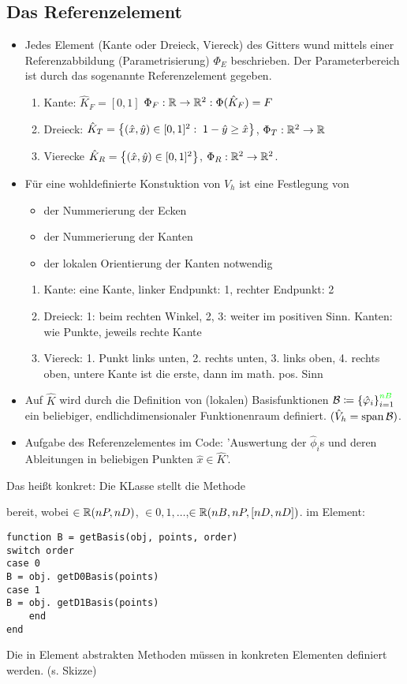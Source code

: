 \subsection{Das Referenzelement}
\begin{itemize}
\item Jedes Element (Kante oder Dreieck, Viereck) des Gitters wund mittels einer Referenzabbildung (Parametrisierung) $\Phi_E$ beschrieben. Der Parameterbereich ist durch das sogenannte Referenzelement gegeben. 
  \begin{enumerate}
  \item Kante: $\hat K_F = [0, 1]$ $\Phi_F: \mathbb{R} \to \mathbb{R}^2: \Phi(\hat K_F) = F$
\item Dreieck: $\hat K_T = \left\{ (\hat x,\hat y) \in [0, 1]^2: \; 1- \hat y \geq  \hat x \right\}$, $\Phi_T: \mathbb{R}^2 \to \mathbb{R}$
\item Vierecke $\hat K_R = \left\{ (\hat x, \hat y) \in [0,1]^2 \right\}$, $\Phi_R: \mathbb{R}^2 \to \mathbb{R}^2$. 
  \end{enumerate}
\item Für eine wohldefinierte Konstuktion von $V_h$ ist eine Festlegung von
  \begin{itemize}
  \item der Nummerierung der Ecken
  \item der Nummerierung der Kanten
  \item der lokalen Orientierung der Kanten notwendig
  \end{itemize}
  \begin{enumerate}
  \item Kante: eine Kante, linker Endpunkt: 1, rechter Endpunkt: 2
  \item Dreieck: 1: beim rechten Winkel, 2, 3: weiter im positiven Sinn. Kanten: wie Punkte, jeweils rechte Kante
\item Viereck: 1. Punkt links unten, 2. rechts unten, 3. links oben, 4. rechts oben, untere Kante ist die erste, dann im math. pos. Sinn  
  \end{enumerate}
\item Auf $\hat K$ wird durch die Definition von (lokalen) Basisfunktionen ${\cal B} \coloneqq \left\{ \hat {\varphi}_i \right\}_{i = 1}^{{\color{green} nB}}$ ein beliebiger, endlichdimensionaler Funktionenraum definiert. $(\hat V_h = \operatorname{span} {\cal B})$. 
\item Aufgabe des Referenzelementes im Code: 'Auswertung der $\hat \phi_i$s und deren Ableitungen in beliebigen Punkten $\hat x \in \hat K$'. 
\end{itemize}
Das heißt konkret: Die KLasse  stellt die Methode
\begin{center}
\end{center}
bereit, wobei  $\in \mathbb{R}(nP, nD)$,  $\in{0, 1, \dots}$,$\in \mathbb{R}(nB, nP, [nD, nD])$.
im Element: 
\begin{verbatim}
function B = getBasis(obj, points, order)
switch order
case 0
B = obj. getD0Basis(points)
case 1
B = obj. getD1Basis(points)
    end
end
\end{verbatim}
Die in Element abstrakten Methoden  müssen in konkreten Elementen definiert werden. (s. Skizze)
